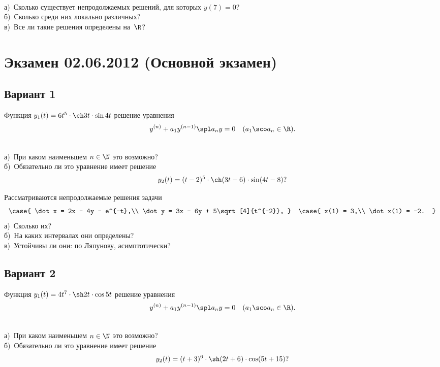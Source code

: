 \documentclass{article}
\begin{document}
\begin{problem}[1+1+2 балла]\\
а)~Сколько существует непродолжаемых решений, для которых $y(7)=0$?\\
б)~Сколько среди них локально различных?\\
в)~Все ли такие решения определены на~$\R$?
\end{problem}



\section{Экзамен 02.06.2012 (Основной экзамен)}

\subsection{Вариант 1}

Функция $y_1(t) = 6t^5 \cdot \ch 3t \cdot \sin 4t$ решение уравнения
$$y^{(n)} + a_1y^{(n-1)}\spl a_ny = 0\quad (a_1\sco a_n \in \R).$$
\begin{problem}[2+2 балла]\\
а)~При каком наименьшем $n \in \N$ это возможно?\\
б)~Обязательно ли это уравнение имеет решение
$$y_2(t) = (t-2)^5\cdot \ch(3t-6)\cdot \sin(4t-8)?$$
\end{problem}

\begin{problem}[2+1+3 балла]
Рассматриваются непродолжаемые решения задачи
$$
\case{
\dot x = 2x - 4y - e^{-t},\\
\dot y = 3x - 6y + 5\sqrt[4]{t^{-2}},
}
\quad
\case{
x(1) = 3,\\
\dot x(1) = -2.
}
$$
а)~Сколько их?\\
б)~На каких интервалах они определены?\\
в)~Устойчивы ли они: по Ляпунову, асимптотически?
\end{problem}

\subsection{Вариант 2}

Функция $y_1(t) = 4t^7 \cdot \sh 2t \cdot \cos 5t$ решение уравнения
$$y^{(n)} + a_1y^{(n-1)}\spl a_ny = 0\quad (a_1\sco a_n \in \R).$$
\begin{problem}[2+2 балла]\\
а)~При каком наименьшем $n \in \N$ это возможно?\\
б)~Обязательно ли это уравнение имеет решение
$$y_2(t) = (t+3)^6\cdot \sh(2t+6)\cdot \cos(5t+15)?$$
\end{problem}
\end{document}

